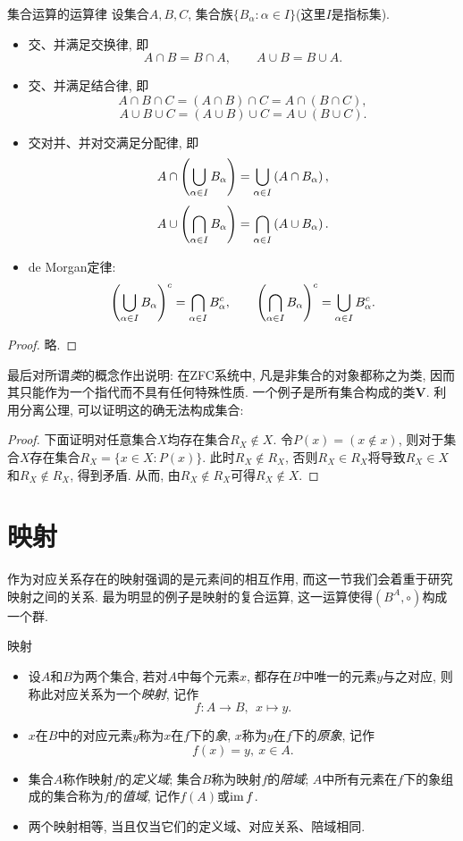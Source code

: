 \begin{proposition}{集合运算的运算律}
	设集合$A, B, C$, 集合族$\{ B_{\alpha} :  \alpha \in I \}$(这里$I$是指标集). 
	\begin{itemize}
		\item 交、并满足交换律, 即$$A \cap B = B \cap A,  \qquad A \cup B = B \cup A.$$
		\item 交、并满足结合律, 即
	$$A \cap B \cap C = (A \cap B) \cap C = A \cap (B \cap C), $$
	$$A \cup B \cup C = (A \cup B) \cup C = A \cup (B \cup C).$$
		\item 交对并、并对交满足分配律, 即
	$$A \cap \left( \bigcup_{\alpha \in I} B_\alpha \right) = \bigcup_{\alpha \in I} \left( A \cap B_{\alpha} \right), $$
	$$A \cup \left( \bigcap_{\alpha \in I} B_\alpha \right) = \bigcap_{\alpha \in I} \left( A \cup B_{\alpha} \right).$$
		\item de Morgan定律: 
	$$\left( \bigcup_{\alpha \in I}B_{\alpha}  \right)^c = \bigcap_{\alpha \in I} B_{\alpha}^c, \qquad \left( \bigcap_{\alpha \in I}B_{\alpha}  \right)^c = \bigcup_{\alpha \in I} B_{\alpha}^c.$$
	\end{itemize}
\end{proposition}
\begin{proof}
	略. 
\end{proof}

最后对所谓\textit{类}的概念作出说明: 在ZFC系统中, 凡是非集合的对象都称之为类, 因而其只能作为一个指代而不具有任何特殊性质. 一个例子是所有集合构成的类$\mathbf{V}$. 利用分离公理, 可以证明这的确无法构成集合: 

\begin{proof}
	下面证明对任意集合$X$均存在集合$R_X \notin X$. 令$P(x)=(x \notin x)$, 则对于集合$X$存在集合$R_X=\{ x \in X:P(x) \}$. 此时$R_X \notin R_X$, 否则$R_X \in R_X$将导致$R_X \in X$和$R_X \notin R_X$, 得到矛盾. 从而, 由$R_X \notin R_X$可得$R_X \notin X$. 
\end{proof}

\section{映射}

作为对应关系存在的映射强调的是元素间的相互作用, 而这一节我们会着重于研究映射之间的关系. 最为明显的例子是映射的复合运算, 这一运算使得$(B^{A},\circ)$构成一个群. 

\begin{definition}{映射}
	\vspace{-2em}
	\begin{itemize}
		\item 设$A$和$B$为两个集合, 若对$A$中每个元素$x$, 都存在$B$中唯一的元素$y$与之对应, 则称此对应关系为一个\textit{映射}, 记作$$f: A \to B, ~~x \mapsto y.$$
		\item $x$在$B$中的对应元素$y$称为$x$在$f$下的\textit{象}, $x$称为$y$在$f$下的\textit{原象}, 记作$$f(x) = y, ~ x \in A.$$
		\item 集合$A$称作映射$f$的\textit{定义域}; 集合$B$称为映射$f$的\textit{陪域}; $A$中所有元素在$f$下的象组成的集合称为$f$的\textit{值域}, 记作$f(A)$或$\operatorname{im} f$.
		\item 两个映射相等, 当且仅当它们的定义域、对应关系、陪域相同.
	\end{itemize}
\end{definition}

